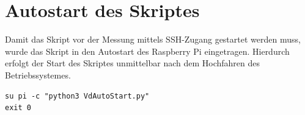 \documentclass[a4paper,12pt,bibliography=totoc, listof=totoc,titlepage]{scrreprt}
\begin{document}
\section{Autostart des Skriptes}
Damit das Skript vor der Messung mittels SSH-Zugang gestartet werden muss, wurde das Skript in den Autostart des Raspberry Pi eingetragen. Hierdurch erfolgt der Start des Skriptes unmittelbar nach dem Hochfahren des Betriebssystemes.

\begin{lstlisting}[caption={Startskript startVLP.sh}, label={startskript}]
su pi -c "python3 VdAutoStart.py"
exit 0
\end{lstlisting}


\renewcommand\UrlFont\itshape


\listoffigures
\listoftables
\end{document}
